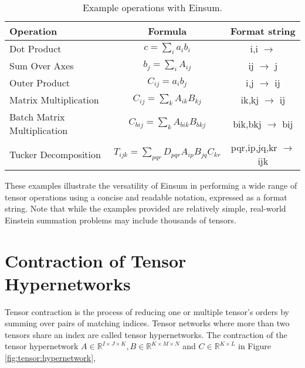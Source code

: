 \begin{table}[hbp]
    \caption{Example operations with Einsum.}
    \label{tab:einsum:ops}
    \centering
    \def\arraystretch{1.1}
    \begin{tabular}{lcc}
        \toprule
        \textbf{Operation}                 & \textbf{Formula}                                    & \textbf{Format string}         \\
        \midrule
        Dot Product                        & $c = \sum_{i} a_{i} b_{i}$                          & i,i $\rightarrow$              \\
        Sum Over Axes                      & $b_{j} = \sum_{i} A_{ij}$                           & ij $\rightarrow$ j             \\
        Outer Product                      & $C_{ij} = a_{i} b_{j}$                              & i,j $\rightarrow$ ij           \\
        Matrix Multiplication              & $C_{ij} = \sum_{k} A_{ik} B_{kj}$                   & ik,kj $\rightarrow$ ij         \\
        Batch Matrix Multiplication        & $C_{bij} = \sum_{k} A_{bik} B_{bkj}$                & bik,bkj $\rightarrow$ bij      \\
        Tucker Decomposition \cite{tucker} & $T_{ijk} = \sum_{pqr} D_{pqr} A_{ip} B_{jq} C_{kr}$ & pqr,ip,jq,kr $\rightarrow$ ijk \\
        \bottomrule
    \end{tabular}
\end{table}

\noindent
These examples illustrate the versatility of Einsum in performing a wide range of
tensor operations using a concise and readable notation, expressed as a format string.
Note that while the examples provided are relatively simple, real-world Einstein
summation problems may include thousands of tensors.

\section{Contraction of Tensor Hypernetworks}
\label{sec:tensor:contractions}
Tensor contraction is the process of reducing one or multiple tensor's orders by summing
over pairs of matching indices. Tensor networks where more than two tensors share an index
are called tensor hypernetworks. The contraction of the tensor hypernetwork
$A \in \mathbb{R}^{I \times J \times K}, B \in \mathbb{R}^{K \times M \times N}$ and
$C \in \mathbb{R}^{K \times L}$ in Figure \ref{fig:tensor:hypernetwork},

